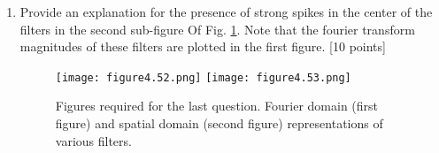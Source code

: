 \documentclass[11pt]{article}
\begin{document}
\begin{enumerate}
\item Provide an explanation for the presence of strong spikes in the center of the filters in the second sub-figure Of Fig. \ref{fig:ff}. Note that the fourier transform magnitudes of these filters are plotted in the first figure. \textsf{[10 points]}
\begin{figure}
    \texttt{[image: figure4.52.png]}
    \texttt{[image: figure4.53.png]}
\caption{Figures required for the last question. Fourier domain (first figure) and spatial domain (second figure) representations of various filters.}
\label{fig:ff}
\end{figure}

\end{enumerate}
\end{document}
